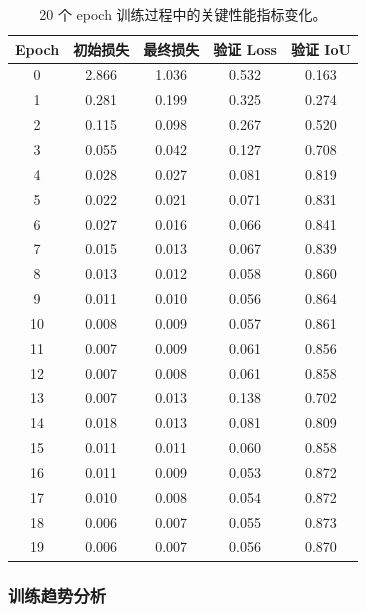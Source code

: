 \documentclass[a4paper]{article}
\begin{document}
\begin{table}[H]
    \centering
    \begin{tabular}{|c|c|c|c|c|}
    \hline
    \textbf{Epoch} & \textbf{初始损失} & \textbf{最终损失} & \textbf{验证 Loss} & \textbf{验证 IoU} \\
    \hline
    0 & 2.866 & 1.036 & 0.532 & 0.163 \\
    \hline
    1 & 0.281 & 0.199 & 0.325 & 0.274 \\
    \hline
    2 & 0.115 & 0.098 & 0.267 & 0.520 \\
    \hline
    3 & 0.055 & 0.042 & 0.127 & 0.708 \\
    \hline
    4 & 0.028 & 0.027 & 0.081 & 0.819 \\
    \hline
    5 & 0.022 & 0.021 & 0.071 & 0.831 \\
    \hline
    6 & 0.027 & 0.016 & 0.066 & 0.841 \\
    \hline
    7 & 0.015 & 0.013 & 0.067 & 0.839 \\
    \hline
    8 & 0.013 & 0.012 & 0.058 & 0.860 \\
    \hline
    9 & 0.011 & 0.010 & 0.056 & 0.864 \\
    \hline
    10 & 0.008 & 0.009 & 0.057 & 0.861 \\
    \hline
    11 & 0.007 & 0.009 & 0.061 & 0.856 \\
    \hline
    12 & 0.007 & 0.008 & 0.061 & 0.858 \\
    \hline
    13 & 0.007 & 0.013 & 0.138 & 0.702 \\
    \hline
    14 & 0.018 & 0.013 & 0.081 & 0.809 \\
    \hline
    15 & 0.011 & 0.011 & 0.060 & 0.858 \\
    \hline
    16 & 0.011 & 0.009 & 0.053 & 0.872 \\
    \hline
    17 & 0.010 & 0.008 & 0.054 & 0.872 \\
    \hline
    18 & 0.006 & 0.007 & 0.055 & 0.873 \\
    \hline
    19 & 0.006 & 0.007 & 0.056 & 0.870 \\
    \hline
    \end{tabular}
    \caption{20 个 epoch 训练过程中的关键性能指标变化。}
    \label{table:training_progress}
\end{table}

\subsubsection{训练趋势分析}
\end{document}
